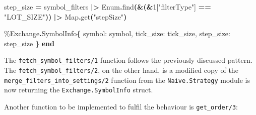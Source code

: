 \documentclass[
  oneside]{book}
\newenvironment{Shaded}{\begin{snugshade}}{\end{snugshade}}
\newcommand{\ConstantTok}[1]{\textcolor[rgb]{0.56,0.35,0.01}{#1}}
\newcommand{\DecValTok}[1]{\textcolor[rgb]{0.00,0.00,0.81}{#1}}
\newcommand{\FunctionTok}[1]{\textcolor[rgb]{0.13,0.29,0.53}{\textbf{#1}}}
\newcommand{\KeywordTok}[1]{\textcolor[rgb]{0.13,0.29,0.53}{\textbf{#1}}}
\newcommand{\NormalTok}[1]{#1}
\newcommand{\OperatorTok}[1]{\textcolor[rgb]{0.81,0.36,0.00}{\textbf{#1}}}
\newcommand{\OtherTok}[1]{\textcolor[rgb]{0.56,0.35,0.01}{#1}}
\newcommand{\StringTok}[1]{\textcolor[rgb]{0.31,0.60,0.02}{#1}}
\newcommand{\VariableTok}[1]{\textcolor[rgb]{0.00,0.00,0.00}{#1}}
\begin{document}
\begin{Shaded}
\begin{Highlighting}[]
\NormalTok{    step\_size }\OperatorTok{=}
\NormalTok{      symbol\_filters}
      \OperatorTok{|\textgreater{}} \ConstantTok{Enum}\OperatorTok{.}\NormalTok{find}\FunctionTok{(}\OperatorTok{\&}\FunctionTok{(}\OperatorTok{\&}\DecValTok{1}\OtherTok{[}\StringTok{"filterType"}\OtherTok{]} \OperatorTok{==} \StringTok{"LOT\_SIZE"}\FunctionTok{))}
      \OperatorTok{|\textgreater{}} \ConstantTok{Map}\OperatorTok{.}\NormalTok{get}\FunctionTok{(}\StringTok{"stepSize"}\FunctionTok{)}

\NormalTok{    \%}\ConstantTok{Exchange}\OperatorTok{.}\ConstantTok{SymbolInfo}\FunctionTok{\{}
      \VariableTok{symbol:}\NormalTok{ symbol,}
      \VariableTok{tick\_size:}\NormalTok{ tick\_size,}
      \VariableTok{step\_size:}\NormalTok{ step\_size}
    \FunctionTok{\}}
  \KeywordTok{end}
\end{Highlighting}
\end{Shaded}

The \texttt{fetch\_symbol\_filters/1} function follows the previously discussed pattern. The \texttt{fetch\_symbol\_filters/2}, on the other hand, is a modified copy of the \texttt{merge\_filters\_into\_settings/2} function from the \texttt{Naive.Strategy} module is now returning the \texttt{Exchange.SymbolInfo} struct.

Another function to be implemented to fulfil the behaviour is \texttt{get\_order/3}:
\end{document}
